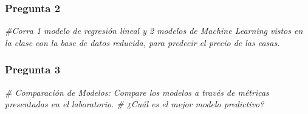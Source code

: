 \documentclass[
]{article}
\newenvironment{Shaded}{\begin{snugshade}}{\end{snugshade}}
\newcommand{\CommentTok}[1]{\textcolor[rgb]{0.56,0.35,0.01}{\textit{#1}}}
\begin{document}
\hypertarget{pregunta-2}{%
\subsubsection{Pregunta 2}\label{pregunta-2}}

\begin{Shaded}
\begin{Highlighting}[]
\CommentTok{\#Corra 1 modelo de regresión lineal y 2 modelos de Machine Learning vistos en la clase con la base de datos reducida,  para predecir el precio de las casas.}
\end{Highlighting}
\end{Shaded}

\hypertarget{pregunta-3}{%
\subsubsection{Pregunta 3}\label{pregunta-3}}

\begin{Shaded}
\begin{Highlighting}[]
\CommentTok{\# Comparación de Modelos: Compare los modelos a través de métricas presentadas en el laboratorio. }
\CommentTok{\# ¿Cuál es el mejor modelo predictivo?}
\end{Highlighting}
\end{Shaded}
\end{document}
